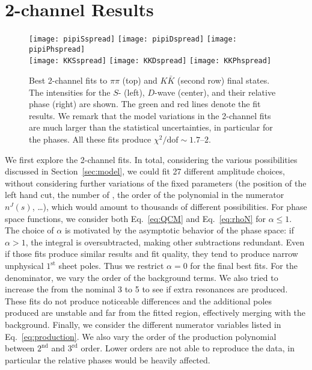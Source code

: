 \section{2-channel Results}
\label{sec:2charesults}

\begin{figure}
\centering
\texttt{[image: pipiSspread]} \texttt{[image: pipiDspread]} \texttt{[image: pipiPhspread]} \\
\texttt{[image: KKSspread]} \texttt{[image: KKDspread]} \texttt{[image: KKPhspread]}
\caption{\label{fig:2channelfits} Best 2-channel fits to $\pi \pi$ (top) and $K \bar K$ (second row) final states. The intensities for the $S$- (left), $D$-wave (center), and their relative phase (right) are shown. The green and red lines denote the fit results. We remark that the model variations in the 2-channel fits are much larger than the statistical uncertainties, in particular for the phases. All these fits produce $\chi^2/\text{dof}\sim 1.7$--$2$. 
}
\end{figure}


We first explore the 2-channel fits. In total, considering the various possibilities discussed in Section~\ref{sec:model}, we could fit 27 different amplitude choices, without considering further variations of the fixed parameters (\eg the position of the left hand cut, the number of \KCDD, the order of the  polynomial in the numerator $n^J(s)$, \dots), which would amount to thousands of different possibilities. 
For phase space functions, we consider both Eq.~\eqref{eq:QCM} and Eq.~\eqref{eq:rhoN} for $\alpha\leq 1$. 
The choice of $\alpha$ is motivated by the asymptotic behavior of the phase space: if $\alpha> 1$, the integral is oversubtracted, making other subtractions redundant. Even if those fits produce similar results and fit quality, they tend to produce narrow unphysical $1^\text{st}$ sheet poles. Thus we restrict $\alpha=0$ for the final best fits. 
For the denominator, we vary the order of the background terms. We also tried to increase the \KCDD from the nominal 3 to 5 to see if extra resonances are produced. These fits do not produce noticeable differences and the additional poles produced are unstable and far from the fitted region, effectively merging with the background. 
Finally, we consider the different numerator variables listed in Eq.~\eqref{eq:production}. We also vary the order of the production polynomial between $2^\text{nd}$ and $3^\text{rd}$ order. Lower orders are not able to reproduce the data, in particular the relative phases would be heavily affected.

